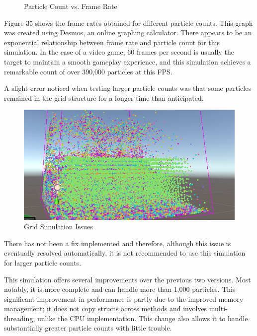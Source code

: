 \documentclass[a4paper, 12pt]{article}
\newcommand{\wideimage}[2][]{%
  \makebox[\textwidth][c]{\texttt{[image: \#2]}}%
}
\begin{document}
    \begin{figure}[H]
        \begin{center}
            \wideimage[width=1.15\textwidth]{exponentialRegression.png}
            \caption{Particle Count vs. Frame Rate \cite{desmos}}
        \end{center}
    \end{figure}

    Figure 35 shows the frame rates obtained for different particle counts. This graph was created using Desmos, an online graphing calculator\cite{desmos}. There appears to be an exponential relationship between frame rate and particle count for this simulation. In the case of a video game, 60 frames per second is usually the target to maintain a smooth gameplay experience, and this simulation achieves a remarkable count of over 390,000 particles at this FPS. 
    
    A slight error noticed when testing larger particle counts was that some particles remained in the grid structure for a longer time than anticipated.

    \begin{figure}[H]
        \begin{center}
            \includegraphics[]{gridIssues.png}
            \caption{Grid Simulation Issues}
        \end{center}
    \end{figure}

    There has not been a fix implemented and therefore, although this issue is eventually resolved automatically, it is not recommended to use this simulation for larger particle counts.

    This simulation offers several improvements over the previous two versions. Most notably, it is more complete and can handle more than 1,000 particles. This significant improvement in performance is partly due to the improved memory management; it does not copy structs across methods and involves multi-threading, unlike the CPU implementation. This change also allows it to handle substantially greater particle counts with little trouble.
\end{document}
